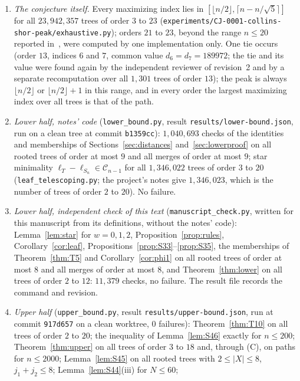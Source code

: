 \documentclass[11pt]{amsart}
\theoremstyle{definition}
\theoremstyle{remark}
\begin{document}
\begin{enumerate}
\item \emph{The conjecture itself.} Every maximizing index lies in
$[\lfloor n/2\rfloor,\lceil n-n/\sqrt5\rceil]$ for all $23{,}942{,}357$ trees of
order $3$ to $23$ (\nolinkurl{experiments/CJ-0001-collins-shor-peak/exhaustive.py});
orders $21$ to $23$, beyond the range $n\le20$ reported in~\cite{AAB}, were
computed by one implementation only. One tie occurs (order $13$, indices $6$
and $7$, common value $d_6=d_7=189972$; the tie and its value were found
again by the independent reviewer of revision~2 and by a separate
recomputation over all $1{,}301$ trees of order $13$); the peak is always
$\lfloor n/2\rfloor$ or $\lfloor n/2\rfloor+1$ in this range, and in every
order the largest maximizing index over all trees is that of the path.
\item \emph{Lower half, notes' code} (\nolinkurl{lower_bound.py}, result
\nolinkurl{results/lower-bound.json}, run on a clean tree at commit
\texttt{b1359cc}): $1{,}040{,}693$ checks of the identities and memberships of
Sections~\ref{sec:distances} and~\ref{sec:lowerproof} on all rooted trees of
order at most $9$ and all merges of order at most $9$; star minimality
$\ell_T-\ell_{S_n}\in\mathcal C_{n-1}$ for all $1{,}346{,}022$ trees of order
$3$ to $20$ (\nolinkurl{leaf_telescoping.py}; the project's notes give
$1{,}346{,}023$, which is the number of trees of order $2$ to $20$). No
failure.
\item \emph{Lower half, independent check of this text}
(\nolinkurl{manuscript_check.py}, written for this manuscript from its
definitions, without the notes' code): Lemma~\ref{lem:star} for $w=0,1,2$,
Proposition~\ref{prop:rules}, Corollary~\ref{cor:leaf},
Propositions~\ref{prop:S33}--\ref{prop:S35}, the memberships of
Theorem~\ref{thm:T5} and Corollary~\ref{cor:phi1} on all rooted trees of
order at most $8$ and all merges of order at most $8$, and
Theorem~\ref{thm:lower} on all trees of order $2$ to $12$: $11{,}379$ checks,
no failure. The result file records the command and revision.
\item \emph{Upper half} (\nolinkurl{upper_bound.py}, result
\nolinkurl{results/upper-bound.json}, run at commit \texttt{917d657} on a
clean worktree, 0 failures): Theorem~\ref{thm:T10} on all trees of order $2$
to $20$; the inequality of Lemma~\ref{lem:S46} exactly for $n\le200$;
Theorem~\ref{thm:upper} on all trees of order $3$ to $18$ and, through (C), on
paths for $n\le2000$; Lemma~\ref{lem:S45} on all rooted trees with
$2\le|X|\le8$, $j_1+j_2\le8$; Lemma~\ref{lem:S44}(iii) for $N\le60$;

\end{enumerate}
\end{document}

